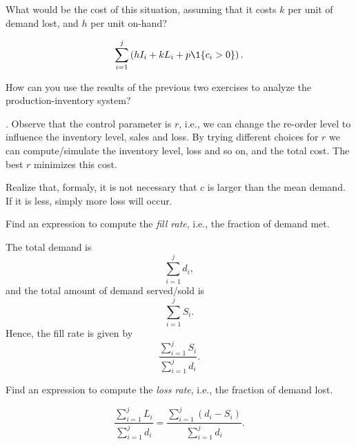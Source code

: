 \begin{exercise}
  What would be the cost of this situation, assuming that it costs $k$
  per unit of demand lost, and $h$ per unit on-hand?
\begin{solution}
  \begin{equation*}
    \sum_{i=1}^j \left(h I_{i} + k L_i + p\1{c_i>0}\right).
  \end{equation*}
\end{solution}
\end{exercise}


\begin{exercise}
  How can you use the results of the previous two exercises to analyze  the production-inventory system? 
  \begin{solution}
. Observe that the control parameter is $r$, i.e., we can change the re-order level to influence the inventory level, sales and loss. By trying different choices for $r$ we
    can compute/simulate the inventory level, loss and so on, and the
    total cost. The best $r$ minimizes this cost.

    Realize that, formaly, it is not necessary that $c$ is larger than
    the mean demand. If it is less, simply more loss will occur.
  \end{solution}
\end{exercise}

\begin{exercise}
Find an expression to compute  the \emph{fill rate}, i.e., the fraction of demand met.
\begin{solution}
The total demand is
\begin{equation*}
 \sum_{i=1}^j d_i, 
\end{equation*}
and the total amount of demand served/sold is 
\begin{equation*}
 \sum_{i=1}^j S_i.
\end{equation*}
Hence, the fill rate is given by
\begin{equation*}
  \frac{\sum_{i=1}^j S_i}{\sum_{i=1}^j d_i}.
\end{equation*}
\end{solution}
\end{exercise}

\begin{exercise}
Find an expression to compute  the \emph{loss rate}, i.e., the fraction of demand lost.
\begin{solution}
\begin{equation*}
  \frac{\sum_{i=1}^j L_i}{\sum_{i=1}^j d_i} = 
  \frac{\sum_{i=1}^j (d_i-S_i)}{\sum_{i=1}^j d_i}.
\end{equation*}
\end{solution}
\end{exercise}

